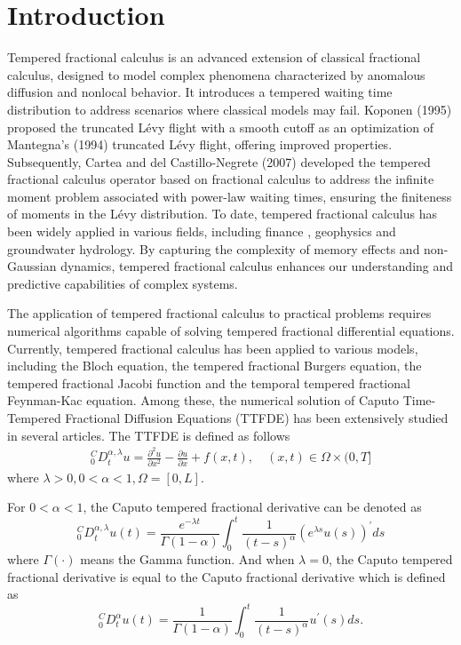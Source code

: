 \documentclass[10pt, reqno]{amsart}
\theoremstyle{remark}
\theoremstyle{definition}
\numberwithin{table}{section}
\begin{document}
\section{Introduction}
Tempered fractional calculus is an advanced extension of classical fractional calculus,  designed to model complex phenomena characterized by anomalous diffusion and nonlocal behavior.  It introduces a tempered waiting time distribution to address scenarios where classical models may fail.  Koponen (1995)\cite{koponen1995} proposed the truncated Lévy flight with a smooth cutoff as an optimization of Mantegna's (1994)\cite{mantegna1994} truncated Lévy flight,  offering improved properties.  Subsequently,  Cartea and del Castillo-Negrete (2007)\cite{cartea2007} developed the tempered fractional calculus operator based on fractional calculus to address the infinite moment problem associated with power-law waiting times,  ensuring the finiteness of moments in the Lévy distribution.  To date,  tempered fractional calculus has been widely applied in various fields,  including finance\cite{carr2002, carr2003, zhou2023} ,  geophysics\cite{meerschaert2008, xia2013, zhang2011, zhang2012} and groundwater hydrology\cite{zhang2014}.  By capturing the complexity of memory effects and non-Gaussian dynamics,  tempered fractional calculus enhances our understanding and predictive capabilities of complex systems. 

The application of tempered fractional calculus to practical problems requires numerical algorithms capable of solving tempered fractional differential equations.  Currently,  tempered fractional calculus has been applied to various models,  including the Bloch equation\cite{feng2022},  the tempered fractional Burgers equation\cite{dwivedi2025, wang2022}, the tempered fractional Jacobi function\cite{zhao2023} and the temporal tempered fractional Feynman-Kac equation\cite{zhao2024}.  Among these,  the numerical solution of Caputo Time-Tempered Fractional Diffusion Equations (TTFDE) has been extensively studied in several articles\cite{fenwick2024, dwivedi2024, krzyzanowski2024, morgado2019, safari2022, zhao2020, zhou2023}.  The TTFDE is defined as follows
\begin{align}
{ }_0^C D_t^{\alpha,  \lambda} u=\frac{\partial^2u}{\partial x^2}-\frac{\partial u}{\partial x}+f(x,  t),  \quad(x,  t) \in \Omega \times(0,  T] \label{no1}
\end{align}
where $\lambda > 0,  0 < \alpha < 1, \Omega=[0, L]$. 

For $0<\alpha<1$,  the Caputo tempered fractional derivative can be denoted as
$$
{ }_0^C D_t^{\alpha,  \lambda} u(t)=\frac{e^{-\lambda t}}{\Gamma(1-\alpha)} \int_0^t \frac{1}{(t-s)^{\alpha}}\left(e^{\lambda s} u(s)\right)^{'} d s
$$
where $\Gamma(\cdot)$ means the Gamma function. 
And when $\lambda = 0$, the Caputo tempered fractional derivative is equal to the Caputo fractional derivative which is defined as
$$
{ }_0^C D_t^\alpha u(t)=\frac{1}{\Gamma(1-\alpha)} \int_0^t \frac{1}{(t-s)^{\alpha}} u^{'}(s) d s. 
$$
\end{document}
